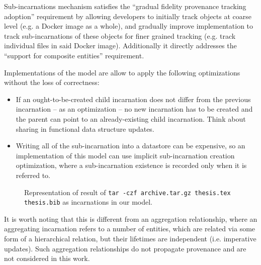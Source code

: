 Sub-incarnations mechanism satisfies the ``gradual fidelity provenance tracking adoption'' requirement by allowing developers to initially track objects at coarse level (e.g. a Docker image as a whole), and gradually improve implementation to track sub-incarnations of these objects for finer grained tracking (e.g. track individual files in said Docker image). Additionally it directly addresses the ``support for composite entities'' requirement.

Implementations of the model are allow to apply the following optimizations without the loss of correctness:
\begin{itemize}
    \item If an ought-to-be-created child incarnation does not differ from the previous incarnation -- as an optimization -- no new incarnation has to be created and the parent can point to an already-existing child incarnation. Think about sharing in functional data structure updates.
    \item Writing all of the sub-incarnation into a datastore can be expensive, so an implementation of this model can use implicit sub-incarnation creation optimization, where a sub-incarnation existence is recorded only when it is referred to.
\end{itemize}

\begin{figure}[t]
\centering
{}
\caption{Representation of result of \texttt{tar -czf archive.tar.gz thesis.tex thesis.bib} as incarnations in our model.}
\label{fig:sub-incarnations}
\end{figure}

It is worth noting that this is different from an aggregation relationship, where an aggregating incarnation refers to a number of entities, which are related via some form of a hierarchical relation, but their lifetimes are independent (i.e. imperative updates). Such aggregation relationships do not propagate provenance and are not considered in this work.

